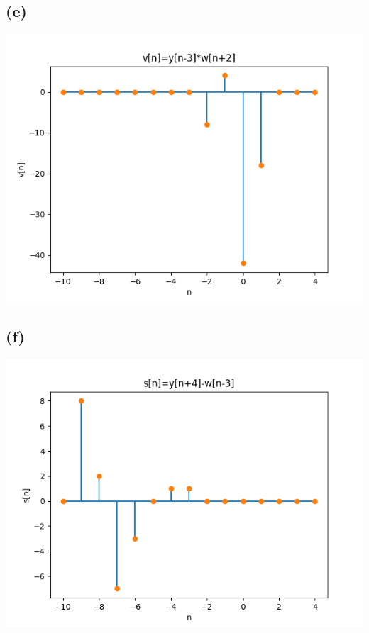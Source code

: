 \subsection*{(e)}
\includegraphics[scale=0.5]{v.png}
\subsection*{(f)}
\includegraphics[scale=0.5]{s.png}
